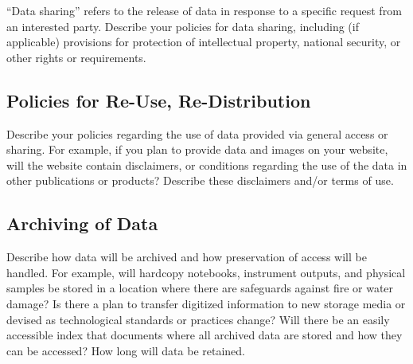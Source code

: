 \documentclass[11pt]{article}
\begin{document}
“Data sharing” refers to the release of data in response to a specific request from an interested party. Describe your policies for data sharing, including (if applicable) provisions for protection of intellectual property, national security, or other rights or requirements.


\subsection{Policies for Re-Use, Re-Distribution}

Describe your policies regarding the use of data provided via general access or sharing. For example, if you plan to provide data and images on your website, will the website contain disclaimers, or conditions regarding the use of the data in other publications or products? Describe these disclaimers and/or terms of use.


\subsection{Archiving of Data}

Describe how data will be archived and how preservation of access will be handled. For example, will hardcopy notebooks, instrument outputs, and physical samples be stored in a location where there are safeguards against fire or water damage? Is there a plan to transfer digitized information to new storage media or devised as technological standards or practices change? Will there be an easily accessible index that documents where all archived data are stored and how they can be accessed?  How long will data be retained. 
\end{document}

